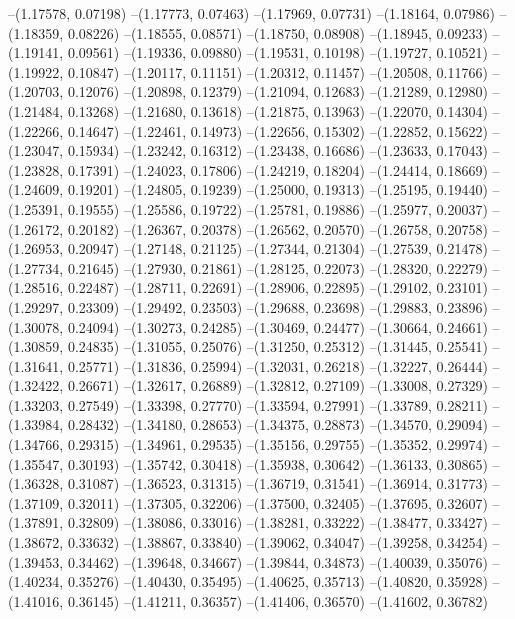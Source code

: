 --(1.17578, 0.07198)
--(1.17773, 0.07463)
--(1.17969, 0.07731)
--(1.18164, 0.07986)
--(1.18359, 0.08226)
--(1.18555, 0.08571)
--(1.18750, 0.08908)
--(1.18945, 0.09233)
--(1.19141, 0.09561)
--(1.19336, 0.09880)
--(1.19531, 0.10198)
--(1.19727, 0.10521)
--(1.19922, 0.10847)
--(1.20117, 0.11151)
--(1.20312, 0.11457)
--(1.20508, 0.11766)
--(1.20703, 0.12076)
--(1.20898, 0.12379)
--(1.21094, 0.12683)
--(1.21289, 0.12980)
--(1.21484, 0.13268)
--(1.21680, 0.13618)
--(1.21875, 0.13963)
--(1.22070, 0.14304)
--(1.22266, 0.14647)
--(1.22461, 0.14973)
--(1.22656, 0.15302)
--(1.22852, 0.15622)
--(1.23047, 0.15934)
--(1.23242, 0.16312)
--(1.23438, 0.16686)
--(1.23633, 0.17043)
--(1.23828, 0.17391)
--(1.24023, 0.17806)
--(1.24219, 0.18204)
--(1.24414, 0.18669)
--(1.24609, 0.19201)
--(1.24805, 0.19239)
--(1.25000, 0.19313)
--(1.25195, 0.19440)
--(1.25391, 0.19555)
--(1.25586, 0.19722)
--(1.25781, 0.19886)
--(1.25977, 0.20037)
--(1.26172, 0.20182)
--(1.26367, 0.20378)
--(1.26562, 0.20570)
--(1.26758, 0.20758)
--(1.26953, 0.20947)
--(1.27148, 0.21125)
--(1.27344, 0.21304)
--(1.27539, 0.21478)
--(1.27734, 0.21645)
--(1.27930, 0.21861)
--(1.28125, 0.22073)
--(1.28320, 0.22279)
--(1.28516, 0.22487)
--(1.28711, 0.22691)
--(1.28906, 0.22895)
--(1.29102, 0.23101)
--(1.29297, 0.23309)
--(1.29492, 0.23503)
--(1.29688, 0.23698)
--(1.29883, 0.23896)
--(1.30078, 0.24094)
--(1.30273, 0.24285)
--(1.30469, 0.24477)
--(1.30664, 0.24661)
--(1.30859, 0.24835)
--(1.31055, 0.25076)
--(1.31250, 0.25312)
--(1.31445, 0.25541)
--(1.31641, 0.25771)
--(1.31836, 0.25994)
--(1.32031, 0.26218)
--(1.32227, 0.26444)
--(1.32422, 0.26671)
--(1.32617, 0.26889)
--(1.32812, 0.27109)
--(1.33008, 0.27329)
--(1.33203, 0.27549)
--(1.33398, 0.27770)
--(1.33594, 0.27991)
--(1.33789, 0.28211)
--(1.33984, 0.28432)
--(1.34180, 0.28653)
--(1.34375, 0.28873)
--(1.34570, 0.29094)
--(1.34766, 0.29315)
--(1.34961, 0.29535)
--(1.35156, 0.29755)
--(1.35352, 0.29974)
--(1.35547, 0.30193)
--(1.35742, 0.30418)
--(1.35938, 0.30642)
--(1.36133, 0.30865)
--(1.36328, 0.31087)
--(1.36523, 0.31315)
--(1.36719, 0.31541)
--(1.36914, 0.31773)
--(1.37109, 0.32011)
--(1.37305, 0.32206)
--(1.37500, 0.32405)
--(1.37695, 0.32607)
--(1.37891, 0.32809)
--(1.38086, 0.33016)
--(1.38281, 0.33222)
--(1.38477, 0.33427)
--(1.38672, 0.33632)
--(1.38867, 0.33840)
--(1.39062, 0.34047)
--(1.39258, 0.34254)
--(1.39453, 0.34462)
--(1.39648, 0.34667)
--(1.39844, 0.34873)
--(1.40039, 0.35076)
--(1.40234, 0.35276)
--(1.40430, 0.35495)
--(1.40625, 0.35713)
--(1.40820, 0.35928)
--(1.41016, 0.36145)
--(1.41211, 0.36357)
--(1.41406, 0.36570)
--(1.41602, 0.36782)
